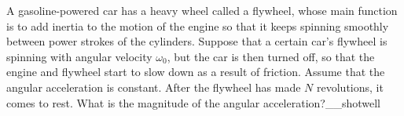A gasoline-powered car has a heavy wheel called a flywheel, whose main function
is to add inertia to the motion of the engine so that it keeps spinning smoothly
between power strokes of the cylinders.
Suppose that a certain car's flywheel is spinning with
angular velocity $\omega_0$, but the car is then turned off, so that the
engine and flywheel start to slow down as a result of friction. Assume that the
angular acceleration is constant. After the flywheel
has made $N$ revolutions, it comes to rest. What is the magnitude of
the angular acceleration?__shotwell\answercheck
